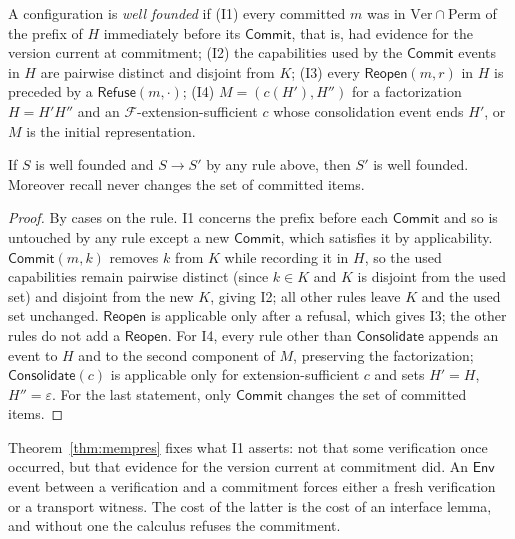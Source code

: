 \begin{definition}[Invariants]
\label{def:meminv}
A configuration is \emph{well founded} if (I1) every committed $m$ was in $\mathrm{Ver}\cap\mathrm{Perm}$ of the prefix of $H$ immediately before its $\mathsf{Commit}$, that is, had evidence for the version current at commitment; (I2) the capabilities used by the $\mathsf{Commit}$ events in $H$ are pairwise distinct and disjoint from $K$; (I3) every $\mathsf{Reopen}(m,r)$ in $H$ is preceded by a $\mathsf{Refuse}(m,\cdot)$; (I4) $M=(c(H'),H'')$ for a factorization $H=H'H''$ and an $\mathcal F$-extension-sufficient $c$ whose consolidation event ends $H'$, or $M$ is the initial representation.
\end{definition}

\begin{theorem}
\label{thm:mempres}
If $S$ is well founded and $S\to S'$ by any rule above, then $S'$ is well founded. Moreover recall never changes the set of committed items.
\end{theorem}

\begin{proof}
By cases on the rule. I1 concerns the prefix before each $\mathsf{Commit}$ and so is untouched by any rule except a new $\mathsf{Commit}$, which satisfies it by applicability. $\mathsf{Commit}(m,k)$ removes $k$ from $K$ while recording it in $H$, so the used capabilities remain pairwise distinct (since $k\in K$ and $K$ is disjoint from the used set) and disjoint from the new $K$, giving I2; all other rules leave $K$ and the used set unchanged. $\mathsf{Reopen}$ is applicable only after a refusal, which gives I3; the other rules do not add a $\mathsf{Reopen}$. For I4, every rule other than $\mathsf{Consolidate}$ appends an event to $H$ and to the second component of $M$, preserving the factorization; $\mathsf{Consolidate}(c)$ is applicable only for extension-sufficient $c$ and sets $H'=H$, $H''=\varepsilon$. For the last statement, only $\mathsf{Commit}$ changes the set of committed items.
\end{proof}

Theorem~\ref{thm:mempres} fixes what I1 asserts: not that some verification once occurred, but that evidence for the version current at commitment did. An $\mathsf{Env}$ event between a verification and a commitment forces either a fresh verification or a transport witness. The cost of the latter is the cost of an interface lemma, and without one the calculus refuses the commitment.


